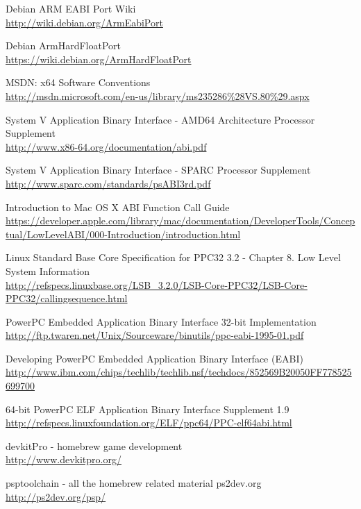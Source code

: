 \begin{thebibliography}{14}
	Debian ARM EABI Port Wiki\\
	\url{http://wiki.debian.org/ArmEabiPort}

	Debian ArmHardFloatPort\\
	\url{https://wiki.debian.org/ArmHardFloatPort}

	MSDN: x64 Software Conventions\\
	\url{http://msdn.microsoft.com/en-us/library/ms235286\%28VS.80\%29.aspx}

	System V Application Binary Interface - AMD64 Architecture Processor Supplement\\
	\url{http://www.x86-64.org/documentation/abi.pdf}

	System V Application Binary Interface - SPARC Processor Supplement\\
	\url{http://www.sparc.com/standards/psABI3rd.pdf}

	Introduction to Mac OS X ABI Function Call Guide\\
	\url{https://developer.apple.com/library/mac/documentation/DeveloperTools/Conceptual/LowLevelABI/000-Introduction/introduction.html}

	Linux Standard Base Core Specification for PPC32 3.2 - Chapter 8. Low Level System Information\\
	\url{http://refspecs.linuxbase.org/LSB\_3.2.0/LSB-Core-PPC32/LSB-Core-PPC32/callingsequence.html}

	PowerPC Embedded Application Binary Interface 32-bit Implementation\\
	\url{http://ftp.twaren.net/Unix/Sourceware/binutils/ppc-eabi-1995-01.pdf}

	Developing PowerPC Embedded Application Binary Interface (EABI)\\
	\url{http://www.ibm.com/chips/techlib/techlib.nsf/techdocs/852569B20050FF778525699700}

	64-bit PowerPC ELF Application Binary Interface Supplement 1.9\\
	\url{http://refspecs.linuxfoundation.org/ELF/ppc64/PPC-elf64abi.html}

	devkitPro - homebrew game development\\
	\url{http://www.devkitpro.org/}

	psptoolchain - all the homebrew related material ps2dev.org\\
	\url{http://ps2dev.org/psp/}


\end{thebibliography}
